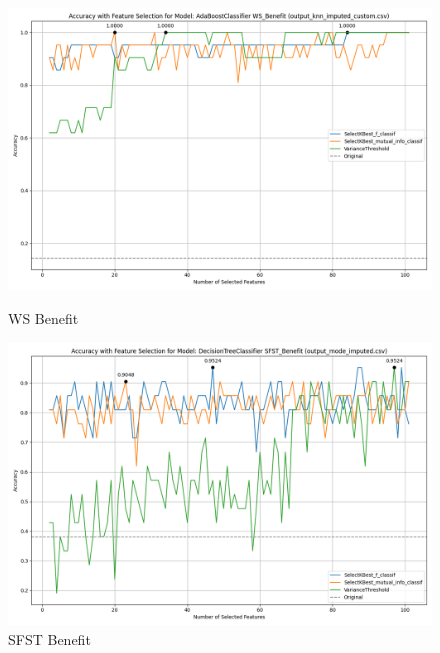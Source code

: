 \begin{figure}[H]
    \centering
    \begin{minipage}[b]{0.45\textwidth}
        \includegraphics[width=\textwidth]{class_all_section/images/feature_selection_accuracy_plot_output_knn_imputed_customcsv_AdaBoostClassifier_WS_Benefit.png}
        \caption{WS Benefit}
        \label{fig:ws_ben_class}
    \end{minipage}
    \hfill
    \begin{minipage}[b]{0.45\textwidth}
        \includegraphics[width=\textwidth]{class_all_section/images/feature_selection_accuracy_plot_output_mode_imputedcsv_DecisionTreeClassifier_SFST_Benefit.png}
        \caption{SFST Benefit}
        \label{fig:sfst_ben_class}
    \end{minipage}
\end{figure}
